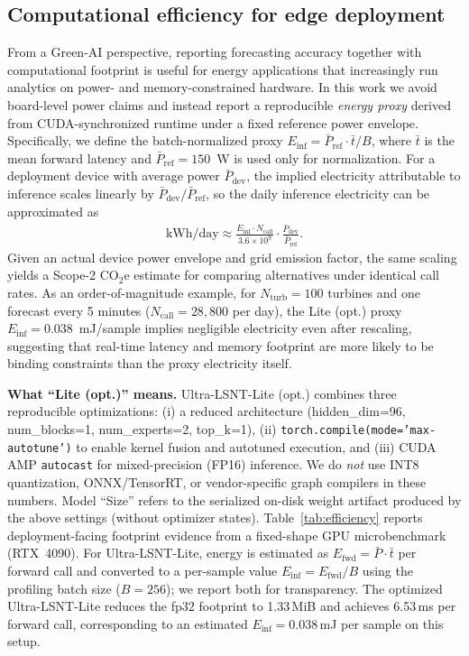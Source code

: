 \documentclass[review,3p,times]{elsarticle}
\begin{document}
\subsection{Computational efficiency for edge deployment}
\label{subsec:results_efficiency}
From a Green-AI perspective, reporting forecasting accuracy together with computational footprint is useful for energy applications that increasingly run analytics on power- and memory-constrained hardware. In this work we avoid board-level power claims and instead report a reproducible \emph{energy proxy} derived from CUDA-synchronized runtime under a fixed reference power envelope. Specifically, we define the batch-normalized proxy $E_{\text{inf}}=\bar{P}_{\text{ref}}\cdot\bar{t}/B$, where $\bar{t}$ is the mean forward latency and $\bar{P}_{\text{ref}}=150$~W is used only for normalization. For a deployment device with average power $\bar{P}_{\text{dev}}$, the implied electricity attributable to inference scales linearly by $\bar{P}_{\text{dev}}/\bar{P}_{\text{ref}}$, so the daily inference electricity can be approximated as
\begin{align}
\text{kWh/day} \approx \frac{E_{\text{inf}} \cdot N_{\text{call}}}{3.6\times 10^{9}}\cdot\frac{\bar{P}_{\text{dev}}}{\bar{P}_{\text{ref}}}.
\end{align}
Given an actual device power envelope and grid emission factor, the same scaling yields a Scope-2 CO$_2$e estimate for comparing alternatives under identical call rates. As an order-of-magnitude example, for $N_{\text{turb}}=100$ turbines and one forecast every 5 minutes ($N_{\text{call}}=28{,}800$ per day), the Lite (opt.) proxy $E_{\text{inf}}=0.038$~mJ/sample implies negligible electricity even after rescaling, suggesting that real-time latency and memory footprint are more likely to be binding constraints than the proxy electricity itself.

\textbf{What ``Lite (opt.)'' means.} Ultra-LSNT-Lite (opt.) combines three reproducible optimizations: (i) a reduced architecture (hidden\_dim=96, num\_blocks=1, num\_experts=2, top\_k=1), (ii) \texttt{torch.compile(mode='max-autotune')} to enable kernel fusion and autotuned execution, and (iii) CUDA AMP \texttt{autocast} for mixed-precision (FP16) inference. We do \emph{not} use INT8 quantization, ONNX/TensorRT, or vendor-specific graph compilers in these numbers. Model ``Size'' refers to the serialized on-disk weight artifact produced by the above settings (without optimizer states).
Table~\ref{tab:efficiency} reports deployment-facing footprint evidence from a fixed-shape GPU microbenchmark (RTX~4090). For Ultra-LSNT-Lite, energy is estimated as $E_{\text{fwd}}=\bar{P}\cdot\bar{t}$ per forward call and converted to a per-sample value $E_{\text{inf}}=E_{\text{fwd}}/B$ using the profiling batch size ($B=256$); we report both for transparency. The optimized Ultra-LSNT-Lite reduces the fp32 footprint to 1.33\,MiB and achieves 6.53\,ms per forward call, corresponding to an estimated $E_{\text{inf}}=0.038$\,mJ per sample on this setup.
\end{document}
